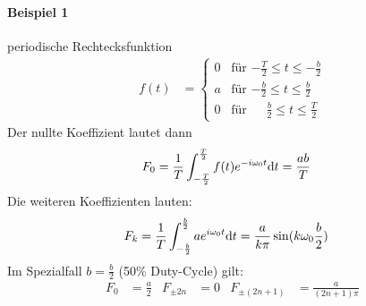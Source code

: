 \paragraph{Beispiel 1} periodische Rechtecksfunktion
\begin{align*}
  f(t)&=\left\{
        \begin{array}{ll}
          0&\text{für $-\frac{T}{2}\leq t\leq -\frac{b}{2}$}\\
          a&\text{für $-\frac{b}{2}\leq t\leq \frac{b}{2}$}\\
          0&\text{für $\phantom{-}\frac{b}{2}\leq t\leq \frac{T}{2}$}
        \end{array}
                        \right.
\end{align*}
Der nullte Koeffizient lautet dann
\begin{align*}
	F_0 &= \frac{1}{T} \int_{-\frac{T}{2}}^{\frac{T}{2}}
          f(t)e^{-i\omega_0 t}\mathrm{d} t
          = \frac{ab}{T}
\end{align*}
Die weiteren Koeffizienten lauten:
\begin{align*}
	F_k &= \frac{1}{T} \int_{-\frac{b}{2}}^{\frac{b}{2}} 
          ae^{i\omega_0 t}\mathrm{d} t
          = \frac{a}{k\pi}\sin(k\omega_0\frac{b}{2})
\end{align*}
Im Spezialfall $b=\frac{b}{2}$ (50\% Duty-Cycle) gilt:
\begin{align*}
  F_0 &= \frac{a}{2}
  &F_{\pm 2n} &= 0
  &F_{\pm (2n+1)} &= \frac{a}{(2n+1)\pi}
\end{align*}


